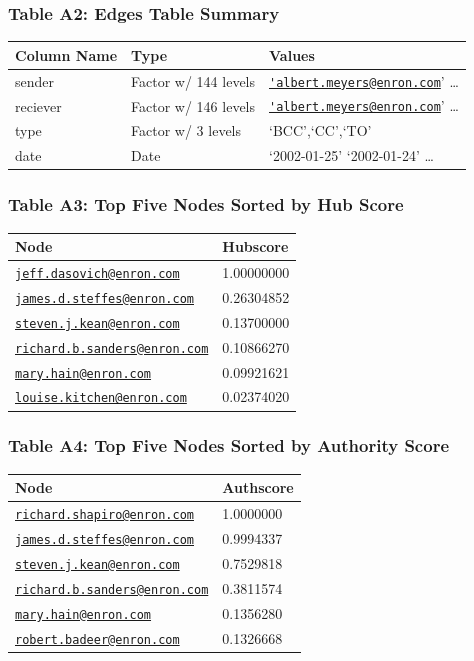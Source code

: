 \documentclass[]{article}
\begin{document}
\subsubsection{Table A2: Edges Table
Summary}\label{table-a2-edges-table-summary}

\begin{longtable}[]{@{}lll@{}}
\toprule
Column Name & Type & Values\tabularnewline
\midrule
\endhead
sender & Factor w/ 144 levels &
\href{mailto:'albert.meyers@enron.com}{\nolinkurl{'albert.meyers@enron.com}}'
\ldots{}\tabularnewline
reciever & Factor w/ 146 levels &
\href{mailto:'albert.meyers@enron.com}{\nolinkurl{'albert.meyers@enron.com}}'
\ldots{}\tabularnewline
type & Factor w/ 3 levels & `BCC',`CC',`TO'\tabularnewline
date & Date & `2002-01-25' `2002-01-24' \ldots{}\tabularnewline
\bottomrule
\end{longtable}

\subsubsection{Table A3: Top Five Nodes Sorted by Hub
Score}\label{table-a3-top-five-nodes-sorted-by-hub-score}

\begin{longtable}[]{@{}ll@{}}
\toprule
Node & Hubscore\tabularnewline
\midrule
\endhead
\href{mailto:jeff.dasovich@enron.com}{\nolinkurl{jeff.dasovich@enron.com}}
& 1.00000000\tabularnewline
\href{mailto:james.d.steffes@enron.com}{\nolinkurl{james.d.steffes@enron.com}}
& 0.26304852\tabularnewline
\href{mailto:steven.j.kean@enron.com}{\nolinkurl{steven.j.kean@enron.com}}
& 0.13700000\tabularnewline
\href{mailto:richard.b.sanders@enron.com}{\nolinkurl{richard.b.sanders@enron.com}}
& 0.10866270\tabularnewline
\href{mailto:mary.hain@enron.com}{\nolinkurl{mary.hain@enron.com}} &
0.09921621\tabularnewline
\href{mailto:louise.kitchen@enron.com}{\nolinkurl{louise.kitchen@enron.com}}
& 0.02374020\tabularnewline
\bottomrule
\end{longtable}

\subsubsection{Table A4: Top Five Nodes Sorted by Authority
Score}\label{table-a4-top-five-nodes-sorted-by-authority-score}

\begin{longtable}[]{@{}ll@{}}
\toprule
Node & Authscore\tabularnewline
\midrule
\endhead
\href{mailto:richard.shapiro@enron.com}{\nolinkurl{richard.shapiro@enron.com}}
& 1.0000000\tabularnewline
\href{mailto:james.d.steffes@enron.com}{\nolinkurl{james.d.steffes@enron.com}}
& 0.9994337\tabularnewline
\href{mailto:steven.j.kean@enron.com}{\nolinkurl{steven.j.kean@enron.com}}
& 0.7529818\tabularnewline
\href{mailto:richard.b.sanders@enron.com}{\nolinkurl{richard.b.sanders@enron.com}}
& 0.3811574\tabularnewline
\href{mailto:mary.hain@enron.com}{\nolinkurl{mary.hain@enron.com}} &
0.1356280\tabularnewline
\href{mailto:robert.badeer@enron.com}{\nolinkurl{robert.badeer@enron.com}}
& 0.1326668\tabularnewline
\bottomrule
\end{longtable}
\end{document}
